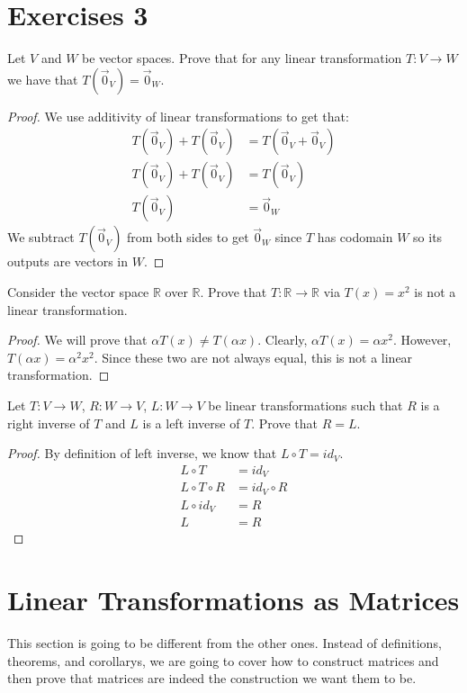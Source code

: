 \section{Exercises 3}
\begin{exercise}
    Let $V$ and $W$ be vector spaces. Prove that for any linear transformation $T:V\to W$ we have that $T(\vec{0}_V)=\vec{0}_W$.
\end{exercise}
\begin{proof}
    We use additivity of linear transformations to get that:
    \begin{align*}
        T(\vec{0}_V)+T(\vec{0}_V)&=T(\vec{0}_V+\vec{0}_V)\\
        T(\vec{0}_V)+T(\vec{0}_V)&=T(\vec{0}_V)\\
        T(\vec{0}_V)&=\vec{0}_W
    \end{align*}
    We subtract $T(\vec{0}_V)$ from both sides to get $\vec{0}_W$ since $T$ has codomain $W$ so its outputs are vectors in $W$.
\end{proof}
\begin{exercise}
    Consider the vector space $\mathbb{R}$ over $\mathbb{R}$. Prove that $T:\mathbb{R}\to \mathbb{R}$ via $T(x)=x^2$ is not a linear transformation.
\end{exercise}
\begin{proof}
    We will prove that $\alpha T(x)\neq T(\alpha x)$. Clearly, $\alpha T(x)=\alpha x^2$. However, $T(\alpha x)=\alpha^2x^2$. Since these two are not always equal, this is not a linear transformation.
\end{proof}
\begin{exercise}
    Let $T:V\to W$, $R: W\to V$, $L: W\to V$ be linear transformations such that $R$ is a right inverse of $T$ and $L$ is a left inverse of $T$. Prove that $R=L$.
\end{exercise}
\begin{proof}
    By definition of left inverse, we know that $L\circ T=id_V$.
    \begin{align*}
        L\circ T&=id_V\\
        L\circ T\circ R&=id_V\circ R\\
        L\circ id_V&=R\\
        L&=R
    \end{align*}
\end{proof}
\section{Linear Transformations as Matrices}
This section is going to be different from the other ones. Instead of definitions, theorems, and corollarys, we are going to cover how to construct matrices and then prove that matrices are indeed the construction we want them to be. 

